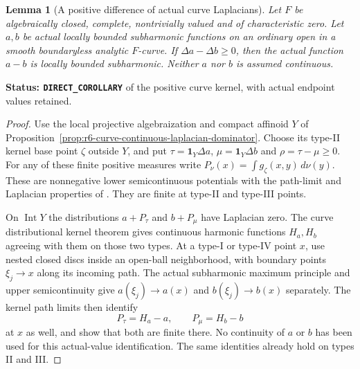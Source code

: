 \documentclass[11pt,a4paper]{article}
\numberwithin{equation}{section}
\newtheorem{lemma}[theorem]{Lemma}
\theoremstyle{definition}
\theoremstyle{remark}
\begin{document}
\begin{lemma}[A positive difference of actual curve Laplacians]
\label{lem:r6-curve-positive-difference}
Let $F$ be algebraically closed, complete, nontrivially valued and of
characteristic zero. Let $a,b$ be actual locally bounded subharmonic
functions on an ordinary open in a smooth boundaryless analytic
$F$-curve. If $\Delta a-\Delta b\ge0$, then the actual function
$a-b$ is locally bounded subharmonic. Neither $a$ nor $b$ is assumed
continuous.
\end{lemma}

\noindent\textbf{Status: \texttt{DIRECT\_COROLLARY}} of the
positive curve kernel, with actual endpoint values retained.

\begin{proof}
Use the local projective algebraization and compact affinoid $Y$ of
Proposition~\ref{prop:r6-curve-continuous-laplacian-dominator}.
Choose its type-II kernel base point $\zeta$ outside $Y$, and put
$\tau=\mathbf1_Y\Delta a$, $\mu=\mathbf1_Y\Delta b$ and
$\rho=\tau-\mu\ge0$. For any of these finite positive measures
write $P_\nu(x)=\int g_\zeta(x,y)\,d\nu(y)$.
These are nonnegative lower semicontinuous potentials with the
path-limit and Laplacian properties of \cite[Propositions 6.5--6.6]{Wan22}.
They are finite at type-II and type-III points.

On $\operatorname{Int}Y$ the distributions $a+P_\tau$ and
$b+P_\mu$ have Laplacian zero. The curve distributional kernel
theorem gives continuous harmonic functions $H_a,H_b$ agreeing with
them on those two types. At a type-I or type-IV point $x$, use
nested closed discs inside an open-ball neighborhood, with boundary
points $\xi_j\to x$ along its incoming path. The actual subharmonic
maximum principle and upper semicontinuity give
$a(\xi_j)\to a(x)$ and $b(\xi_j)\to b(x)$ separately.
The kernel path limits then identify
\[
                  P_\tau=H_a-a,\qquad P_\mu=H_b-b
\]
at $x$ as well, and show that both are finite there. No continuity
of $a$ or $b$ has been used for this actual-value identification.
The same identities already hold on types II and III.


\end{proof}
\end{document}
